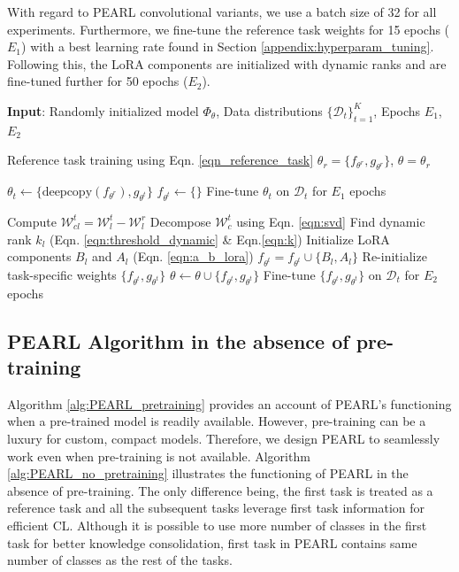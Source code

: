 \documentclass[10pt]{article} %
\begin{document}
With regard to PEARL convolutional variants, we use a batch size of 32 for all experiments. Furthermore, we fine-tune the reference task weights for 15 epochs ($E_1$) with a best learning rate found in Section \ref{appendix:hyperparam_tuning}. Following this, the LoRA components are initialized with dynamic ranks and are fine-tuned further for 50 epochs ($E_2$).  

\begin{algorithm}[hbt!]
\caption{PEARL (without pre-training)}
\label{alg:PEARL_no_pretraining}
\begin{algorithmic}[1]
   \State \textbf{Input}: Randomly initialized model $\Phi_\theta$, Data distributions $\{\mathcal{D}_t\}_{t=1}^K$, Epochs $E_1$, $E_2$

   \State Reference task training using Eqn. \ref{eqn_reference_task}
   \State $\theta_r = \{f_{\theta^{r}}, g_{\theta^{r}}\}$, $\theta = \theta_r$

   
        \State $\theta_t \gets \{\text{deepcopy}(f_{\theta^{r}}), g_{\theta^{t}} \}$
        \State $f_{\theta^{t}} \gets \{\}$
        \State Fine-tune $\theta_t$ on $\mathcal{D}_t$ for $E_1$ epochs

           \State Compute $\mathcal{W}^{t}_{cl}= \mathcal{W}^{t}_{l} - \mathcal{W}^{r}_{l}$ 
           \State Decompose $\mathcal{W}_c^t$ using Eqn. \ref{eqn:svd}
           \State Find dynamic rank $k_l$ (Eqn. \ref{eqn:threshold_dynamic} \& Eqn.\ref{eqn:k})
           \State Initialize LoRA components $B_l$ and $A_l$ (Eqn. \ref{eqn:a_b_lora})
           \State $f_{\theta^{t}} = f_{\theta^{t}} \cup \{B_l, A_l\}$
        \EndFor 
    \State Re-initialize task-specific weights $\{f_{\theta^{t}}, g_{\theta^{t}}\}$
    \State $\theta \gets \theta \cup \{f_{\theta^{t}}, g_{\theta^{t}}\}$
    \State Fine-tune $\{f_{\theta^{t}}, g_{\theta^{t}}\}$ on $\mathcal{D}_t$ for $E_2$ epochs
   \EndFor
{}
\end{algorithmic}
\end{algorithm}



\subsection{PEARL Algorithm in the absence of pre-training}


Algorithm \ref{alg:PEARL_pretraining} provides an account of PEARL's functioning when a pre-trained model is readily available. However, pre-training can be a luxury for custom, compact models. Therefore, we design PEARL to seamlessly work even when pre-training is not available. Algorithm \ref{alg:PEARL_no_pretraining} illustrates the functioning of PEARL in the absence of pre-training. The only difference being, the first task is treated as a reference task and all the subsequent tasks leverage first task information for efficient CL. Although it is possible to use more number of classes in the first task for better knowledge consolidation, first task in PEARL contains same number of classes as the rest of the tasks. 
\end{document}
